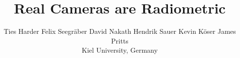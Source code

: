\documentclass[10pt,twocolumn,letterpaper]{article}
\title{Real Cameras are Radiometric}
\author{Ties Harder \quad Felix Seegr\"aber \quad David Nakath \quad Hendrik Sauer \quad Kevin K\"oser \quad James Pritts\\
Kiel University, Germany\\
}
\begin{document}
\maketitle
% 






% 





{
    \small
    
    
}


\end{document}

